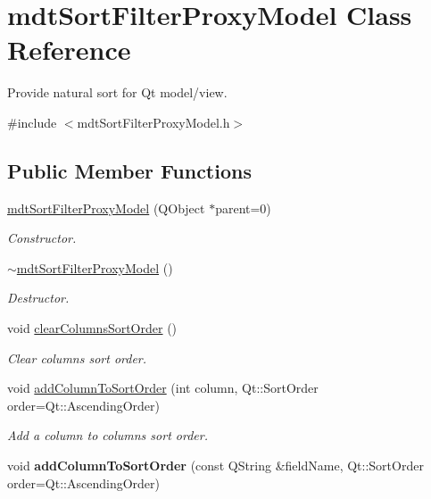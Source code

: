 \hypertarget{classmdt_sort_filter_proxy_model}{
\section{mdtSortFilterProxyModel Class Reference}
\label{classmdt_sort_filter_proxy_model}
}


Provide natural sort for Qt model/view.  




{\ttfamily \#include $<$mdtSortFilterProxyModel.h$>$}

\subsection*{Public Member Functions}
\begin{DoxyCompactItemize}
\item 
\hypertarget{classmdt_sort_filter_proxy_model_a83bcd157f655c4d675e5a30d97fa16ba}{
\hyperlink{classmdt_sort_filter_proxy_model_a83bcd157f655c4d675e5a30d97fa16ba}{mdtSortFilterProxyModel} (QObject $\ast$parent=0)}
\label{classmdt_sort_filter_proxy_model_a83bcd157f655c4d675e5a30d97fa16ba}

\begin{DoxyCompactList}\small\item\em Constructor. \end{DoxyCompactList}\item 
\hypertarget{classmdt_sort_filter_proxy_model_a5d1c4647657a13d4b225e790a6b8d1a3}{
\hyperlink{classmdt_sort_filter_proxy_model_a5d1c4647657a13d4b225e790a6b8d1a3}{$\sim$mdtSortFilterProxyModel} ()}
\label{classmdt_sort_filter_proxy_model_a5d1c4647657a13d4b225e790a6b8d1a3}

\begin{DoxyCompactList}\small\item\em Destructor. \end{DoxyCompactList}\item 
void \hyperlink{classmdt_sort_filter_proxy_model_aad45b85d23fe3c2eb6198a9eece685d2}{clearColumnsSortOrder} ()
\begin{DoxyCompactList}\small\item\em Clear columns sort order. \end{DoxyCompactList}\item 
void \hyperlink{classmdt_sort_filter_proxy_model_afaba32df90528901e671e0ff20f51e41}{addColumnToSortOrder} (int column, Qt::SortOrder order=Qt::AscendingOrder)
\begin{DoxyCompactList}\small\item\em Add a column to columns sort order. \end{DoxyCompactList}\item 
\hypertarget{classmdt_sort_filter_proxy_model_ae447c8f1449b1314fac2448c8b004885}{
void {\bfseries addColumnToSortOrder} (const QString \&fieldName, Qt::SortOrder order=Qt::AscendingOrder)}
\label{classmdt_sort_filter_proxy_model_ae447c8f1449b1314fac2448c8b004885}

\end{DoxyCompactItemize}


